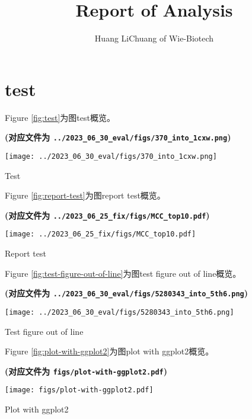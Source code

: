 \documentclass[
]{article}
\title{Report of Analysis}
\author{Huang LiChuang of Wie-Biotech}
\date{}
\begin{document}
\maketitle

{
\setcounter{tocdepth}{3}
\tableofcontents
}
\listoffigures

\listoftables

\hypertarget{test}{%
\section{test}\label{test}}

Figure \ref{fig:test}为图test概览。

\textbf{(对应文件为 \texttt{../2023\_06\_30\_eval/figs/370\_into\_1cxw.png})}

\def\@captype{figure}
\begin{center}
\texttt{[image: ../2023\_06\_30\_eval/figs/370\_into\_1cxw.png]}
\caption{Test}\label{fig:test}
\end{center}

Figure \ref{fig:report-test}为图report test概览。

\textbf{(对应文件为 \texttt{../2023\_06\_25\_fix/figs/MCC\_top10.pdf})}

\def\@captype{figure}
\begin{center}
\texttt{[image: ../2023\_06\_25\_fix/figs/MCC\_top10.pdf]}
\caption{Report test}\label{fig:report-test}
\end{center}

Figure \ref{fig:test-figure-out-of-line}为图test figure out of line概览。

\textbf{(对应文件为 \texttt{../2023\_06\_30\_eval/figs/5280343\_into\_5th6.png})}

\def\@captype{figure}
\begin{center}
\texttt{[image: ../2023\_06\_30\_eval/figs/5280343\_into\_5th6.png]}
\caption{Test figure out of line}\label{fig:test-figure-out-of-line}
\end{center}

Figure \ref{fig:plot-with-ggplot2}为图plot with ggplot2概览。

\textbf{(对应文件为 \texttt{figs/plot-with-ggplot2.pdf})}

\def\@captype{figure}
\begin{center}
\texttt{[image: figs/plot-with-ggplot2.pdf]}
\caption{Plot with ggplot2}\label{fig:plot-with-ggplot2}
\end{center}
\end{document}
